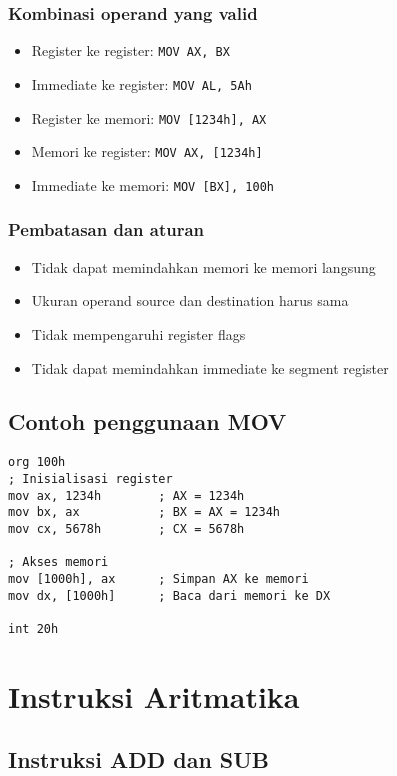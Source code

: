 \documentclass[../main.tex]{subfiles}
\begin{document}
\subsubsection{Kombinasi operand yang valid}
\begin{itemize}
    \item Register ke register: \texttt{MOV AX, BX}
    \item Immediate ke register: \texttt{MOV AL, 5Ah}
    \item Register ke memori: \texttt{MOV [1234h], AX}
    \item Memori ke register: \texttt{MOV AX, [1234h]}
    \item Immediate ke memori: \texttt{MOV [BX], 100h}
\end{itemize}

\subsubsection{Pembatasan dan aturan}
\begin{itemize}
    \item Tidak dapat memindahkan memori ke memori langsung
    \item Ukuran operand source dan destination harus sama
    \item Tidak mempengaruhi register flags
    \item Tidak dapat memindahkan immediate ke segment register
\end{itemize}

\subsection{Contoh penggunaan MOV}
\begin{verbatim}
org 100h
; Inisialisasi register
mov ax, 1234h        ; AX = 1234h
mov bx, ax           ; BX = AX = 1234h
mov cx, 5678h        ; CX = 5678h

; Akses memori
mov [1000h], ax      ; Simpan AX ke memori
mov dx, [1000h]      ; Baca dari memori ke DX

int 20h
\end{verbatim}

\section{Instruksi Aritmatika}\label{sec:instruksi-dasar-aritmatika}
\subsection{Instruksi ADD dan SUB}
\end{document}
